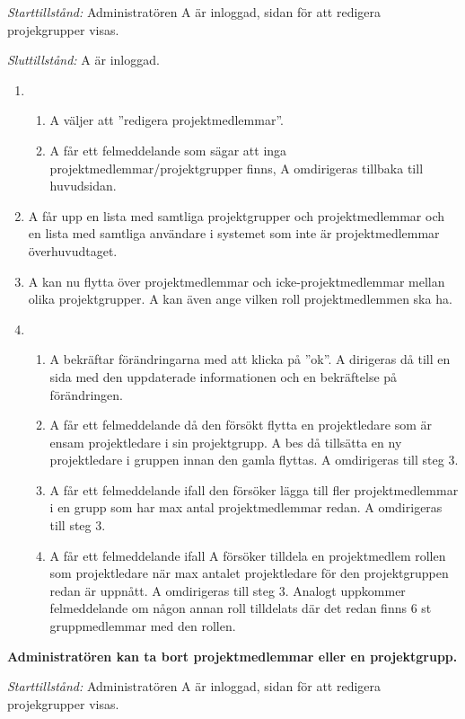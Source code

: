\documentclass[a4paper]{article}
\begin{document}
\begin{ST}
\emph{Starttillstånd:} Administratören A är inloggad, sidan för att redigera projekgrupper visas.

\emph{Sluttillstånd:} A är inloggad.

\begin{enumerate}
\item 
\begin{enumerate}
\item A väljer att ''redigera projektmedlemmar''.
\item A får ett felmeddelande som sägar att inga projektmedlemmar/projektgrupper finns, A omdirigeras tillbaka till huvudsidan.
\end{enumerate}
\item A får upp en lista med samtliga projektgrupper och projektmedlemmar och en lista med samtliga användare i systemet som inte är projektmedlemmar överhuvudtaget.

\item A kan nu flytta över projektmedlemmar och icke-projektmedlemmar mellan olika projektgrupper. A kan även ange vilken roll projektmedlemmen ska ha.
\item 
\begin{enumerate}
\item A bekräftar förändringarna med att klicka på ''ok''. A dirigeras då till en sida med den uppdaterade informationen och en bekräftelse på förändringen.
\item A får ett felmeddelande då den försökt flytta en projektledare som är ensam projektledare i sin projektgrupp. A bes då tillsätta en ny projektledare i gruppen innan den gamla flyttas. A omdirigeras till steg 3.
\item A får ett felmeddelande ifall den försöker lägga till fler projektmedlemmar i en grupp som har max antal projektmedlemmar redan. A omdirigeras till steg 3.
\item A får ett felmeddelande ifall A försöker tilldela en projektmedlem rollen som projektledare när max antalet projektledare för den projektgruppen redan är uppnått. A omdirigeras till steg 3. Analogt uppkommer felmeddelande om någon annan roll tilldelats där det redan finns 6 st gruppmedlemmar med den rollen.
\end{enumerate}
\end{enumerate}

\item
\textbf{Administratören kan ta bort projektmedlemmar eller en projektgrupp.}

\emph{Starttillstånd:} Administratören A är inloggad, sidan för att redigera projekgrupper visas.


\end{ST}
\end{document}

